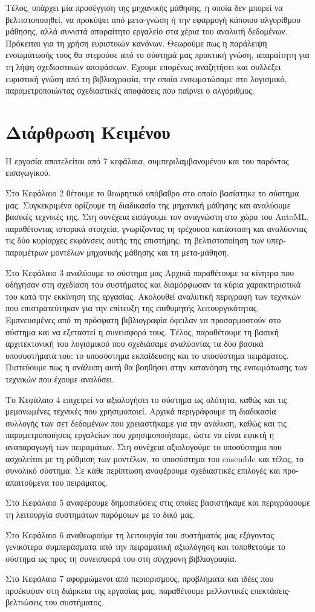 Τέλος, υπάρχει μία προσέγγιση της μηχανικής μάθησης, η οποία δεν μπορεί να βελτιστοποιηθεί, να προκύψει από μετα-γνώση ή την εφαρμογή κάποιου αλγορίθμου μάθησης, αλλά συνιστά απαραίτητο εργαλείο στα χέρια του αναλυτή δεδομένων. Πρόκειται για τη χρήση ευριστικών κανόνων. Θεωρούμε πως η παράλειψη ενσωμάτωσής τους θα στερούσε από το σύστημά μας πρακτική γνώση, απαραίτητη για τη λήψη σχεδιαστικών αποφάσεων. Έχουμε επομένως αναζητήσει και συλλέξει ευριστική γνώση από τη βιβλιογραφία, την οποία ενσωματώσαμε στο λογισμικό, παραμετροποιώντας σχεδιαστικές αποφάσεις που παίρνει ο αλγόριθμος.

\section{Διάρθρωση Κειμένου} Η εργασία αποτελείται από 7 κεφάλαια, συμπεριλαμβανομένου και του παρόντος εισαγωγικού.

Στο Κεφάλαιο 2 θέτουμε το θεωρητικό υπόβαθρο στο οποίο βασίστηκε το σύστημα μας. Συγκεκριμένα ορίζουμε τη διαδικασία της μηχανική μάθησης και αναλύουμε βασικές τεχνικές της. Στη συνέχεια εισάγουμε τον αναγνώστη στο χώρο του AutoML, παραθέτοντας ιστορικά στοιχεία, γνωρίζοντας τη τρέχουσα κατάσταση και αναλύοντας τις δύο κυρίαρχες εκφάνσεις αυτής της επιστήμης: τη βελτιστοποίηση των υπερ-παραμέτρων μοντέλων μηχανικής μάθησης και τη μετα-μάθηση.  

Στο Κεφάλαιο 3 αναλύουμε το σύστημα μας Αρχικά παραθέτουμε τα κίνητρα που οδήγησαν στη σχεδίαση του συστήματος και διαμόρφωσαν τα κύρια χαρακτηριστικά του κατά την εκκίνηση της εργασίας. Ακολουθεί αναλυτική περιγραφή των τεχνικών που επιστρατεύτηκαν για την επίτευξη της επιθυμητής λειτουργικότητας. Εμπνευσμένες από τη πρόσφατη βιβλιογραφία όφειλαν να προσαρμοστούν στο σύστημα και να εξεταστεί η συνεισφορά τους. Τέλος, παραθέτουμε τη βασική αρχιτεκτονική του λογισμικού που σχεδιάσαμε αναλύοντας τα δύο βασικά υποσυστήματά του: το υποσύστημα εκπαίδευσης και το υποσύστημα πειράματος. Πιστεύουμε πως η ανάλυση αυτή θα βοηθήσει στην κατανόηση της ενσωμάτωσης των τεχνικών που έχουμε αναλύσει.

Το Κεφάλαιο 4 επιχειρεί να αξιολογήσει το σύστημα ως ολότητα, καθώς και τις μεμονωμένες τεχνικές που χρησιμοποιεί. Αρχικά περιγράφουμε τη διαδικασία συλλογής των σετ δεδομένων που χρειαστήκαμε για την ανάλυση, καθώς και τις παραμετροποιήσεις εργαλείων που χρησιμοποιήσαμε, ώστε να είναι εφικτή η αναπαραγωγή των πειραμάτων. Στη συνέχεια αξιολογούμε το υποσύστημα που ασχολείται με τη ρύθμιση των μοντέλων, το υποσύστημα του ensemble και τέλος, το συνολικό σύστημα. Σε κάθε περίπτωση αναφέρουμε σχεδιαστικές επιλογές και προ-απαιτούμενα του πειράματος.

Στο Κεφάλαιο 5 αναφέρουμε δημοσιεύσεις στις οποίες βασιστήκαμε και περιγράφουμε τη λειτουργία συστημάτων παρόμοιων με το δικό μας.

Στο Κεφάλαιο 6 αναθεωρούμε τη λειτουργία του συστήματός μας εξάγοντας γενικότερα συμπεράσματα από την πειραματική αξιολόγηση και τοποθετούμε το σύστημα ως προς τη συνεισφορά του στη σύγχρονη βιβλιογραφία.

Στο Κεφάλαιο 7 αφορμώμενοι από περιορισμούς, προβλήματα και ιδέες που προέκυψαν στη διάρκεια της εργασίας μας, παραθέτουμε μελλοντικές επεκτάσεις-βελτιώσεις του συστήματος. 

